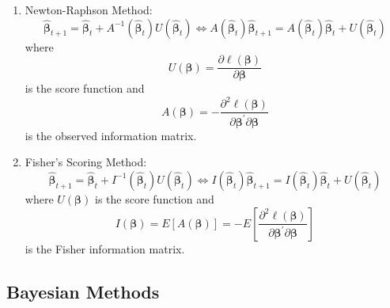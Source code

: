 \begin{enumerate}
    \item Newton-Raphson Method:
          \begin{equation}
              \hat{\boldsymbol{\beta}}_{t+1}=\hat{\boldsymbol{\beta}}_{t}+A^{-1}\left(\hat{\boldsymbol{\beta}}_{t}\right)U\left(\hat{\boldsymbol{\beta}}_{t}\right)\Leftrightarrow A\left(\hat{\boldsymbol{\beta}}_{t}\right)\hat{\boldsymbol{\beta}}_{t+1}=A\left(\hat{\boldsymbol{\beta}}_{t}\right)\hat{\boldsymbol{\beta}}_{t}+U\left(\hat{\boldsymbol{\beta}}_{t}\right)
          \end{equation}
          where
          \begin{equation}
              U\left(\boldsymbol{\beta}\right)=\frac{\partial\ell\left(\boldsymbol{\beta}\right)}{\partial\boldsymbol{\beta}}
          \end{equation}
          is the score function and
          \begin{equation}
              A\left(\boldsymbol{\beta}\right)=-\frac{\partial^{2}\ell\left(\boldsymbol{\beta}\right)}{\partial\boldsymbol{\beta}^{\prime}\partial\boldsymbol{\beta}}
          \end{equation}
          is the observed information matrix.
    \item Fisher’s Scoring Method:
          \begin{equation}
              \hat{\boldsymbol{\beta}}_{t+1}=\hat{\boldsymbol{\beta}}_{t}+I^{-1}\left(\hat{\boldsymbol{\beta}}_{t}\right)U\left(\hat{\boldsymbol{\beta}}_{t}\right)\Leftrightarrow I\left(\hat{\boldsymbol{\beta}}_{t}\right)\hat{\boldsymbol{\beta}}_{t+1}=I\left(\hat{\boldsymbol{\beta}}_{t}\right)\hat{\boldsymbol{\beta}}_{t}+U\left(\hat{\boldsymbol{\beta}}_{t}\right)
          \end{equation}
          where $U\left(\boldsymbol{\beta}\right)$ is the score function and
          \begin{equation}
              I\left(\boldsymbol{\beta}\right)=E\left[A\left(\boldsymbol{\beta}\right)\right]=-E\left[\frac{\partial^{2}\ell\left(\boldsymbol{\beta}\right)}{\partial\boldsymbol{\beta}^{\prime}\partial\boldsymbol{\beta}}\right]
          \end{equation}
          is the Fisher information matrix.
\end{enumerate}

\subsection{Bayesian Methods}

